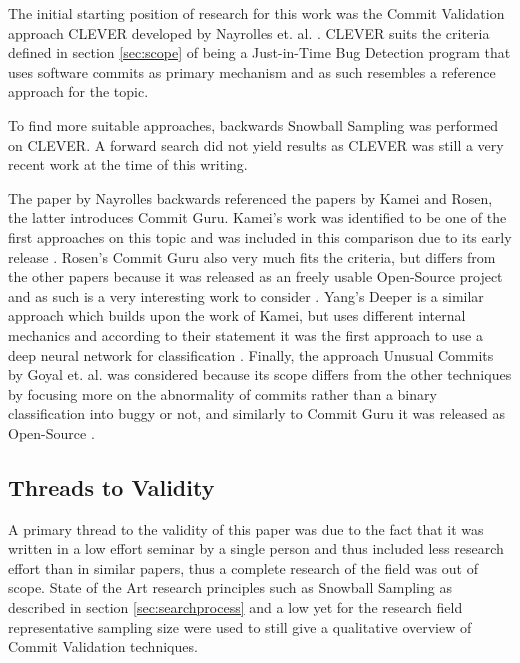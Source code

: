 The initial starting position of research for this work was the Commit Validation approach CLEVER developed by Nayrolles et. al. \cite{Nayrolles2018}. CLEVER suits the criteria defined in section \ref{sec:scope} of being a Just-in-Time Bug Detection program that uses software commits as primary mechanism and as such resembles a reference approach for the topic.  

To find more suitable approaches, backwards Snowball Sampling was performed on CLEVER. A forward search did not yield results as CLEVER was still a very recent work at the time of this writing.

The paper by Nayrolles backwards referenced the papers by Kamei and Rosen, the latter introduces Commit Guru. Kamei's work was identified to be one of the first approaches on this topic and was included in this comparison due to its early release \cite{Kamei2013}. Rosen's Commit Guru also very much fits the criteria, but differs from the other papers because it was released as an freely usable Open-Source project and as such is a very interesting work to consider \cite{Rosen2015}. Yang's Deeper is a similar approach which builds upon the work of Kamei, but uses different internal mechanics and according to their statement it was the first approach to use a deep neural network for classification \cite{Yang2015}. Finally, the approach Unusual Commits by Goyal et. al. was considered because its scope differs from the other techniques by focusing more on the abnormality of commits rather than a binary classification into buggy or not, and similarly to Commit Guru it was released as Open-Source \cite{Goyal2017}.

\subsection{Threads to Validity}

A primary thread to the validity of this paper was due to the fact that it was written in a low effort seminar by a single person and thus included less research effort than in similar papers, thus a complete research of the field was out of scope. State of the Art research principles such as Snowball Sampling as described in section \ref{sec:searchprocess} and a low yet for the research field representative sampling size were used to still give a qualitative overview of Commit Validation techniques.

